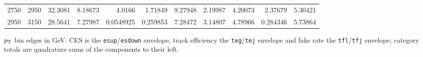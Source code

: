 \begin{landscape}
\begin{table}[p]
\begin{tabular}{rrr rrrr rrrr}
2750 & 2950 & 32.3081 & 8.18673 & 4.0166 & 1.71849 & 9.27948 & 2.19987 & 4.20073 & 2.37679 & 5.30421 \\
2950 & 3150 & 28.5641 & 7.27987 & 0.0548925 & 0.259853 & 7.28472 & 3.14807 & 4.78966 & 0.284346 & 5.73864 \\
\bottomrule
\end{tabular}
\par\vspace{4pt}
\begin{minipage}{\textwidth}\footnotesize $p_{\mathrm{T}}$ bin edges in GeV. CES is the \texttt{esup}/\texttt{esdown} envelope, track efficiency the \texttt{teg}/\texttt{tej} envelope and fake rate the \texttt{tfl}/\texttt{tfj} envelope; category totals are quadrature sums of the components to their left.\end{minipage}
\end{table}
\end{landscape}
